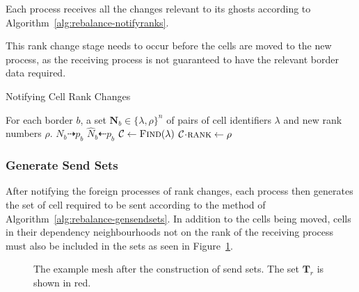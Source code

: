 \documentclass[twoside]{IIBproject}
\newcommand{\vect} [1] {\bm{#1}}
\newcommand{\dra}{\dashrightarrow}
\newcommand{\dla}{\dashleftarrow}
\newcommand{\acc}{{\mkern 0.5mu\cdot\mkern 0.5mu}}
\numberwithin{figure}{section}
\begin{document}
            Each process receives all the changes relevant to its ghosts according to Algorithm~\ref{alg:rebalance-notifyranks}.

            This rank change stage needs to occur before the cells are moved to the new process, as the receiving process is not guaranteed to have the relevant border data required.

            \begin{algorithm}[!htbp]
                \caption{Notifying Cell Rank Changes}
                \label{alg:rebalance-notifyranks}

                \begin{algorithmic}
                    \Require For each border $b$, a set $\vect{N}_b \in \{\lambda,\rho\}^n$ of pairs of cell identifiers $\lambda$ and new rank numbers $\rho$.
                    \Statex
                        \Send $N_b \dra p_b$
                    \EndFor
                    \Statex
                        \Recv $\hat N_b \dla p_b$
                            \State $\mathcal{C}\gets\textproc{Find}(\lambda)$
                            \State $\mathcal{C}\acc\textproc{rank} \gets \rho$
                        \EndFor
                    \EndFor
                \end{algorithmic}
            \end{algorithm}



        \subsubsection{Generate Send Sets} %
            \label{sec:rebalancing-gensendset}

            After notifying the foreign processes of rank changes, each process then generates the set of cell required to be sent according to the method of Algorithm~\ref{alg:rebalance-gensendsets}. In addition to the cells being moved, cells in their dependency neighbourhoods not on the rank of the receiving process must also be included in the sets as seen in Figure~\ref{fig:rebalance-transfer}.

            \begin{figure}[!htbp]
                
                \caption{The example mesh after the construction of send sets. The set $\vect{T}_r$ is shown in red.}
                \label{fig:rebalance-transfer}
            \end{figure}
\end{document}
